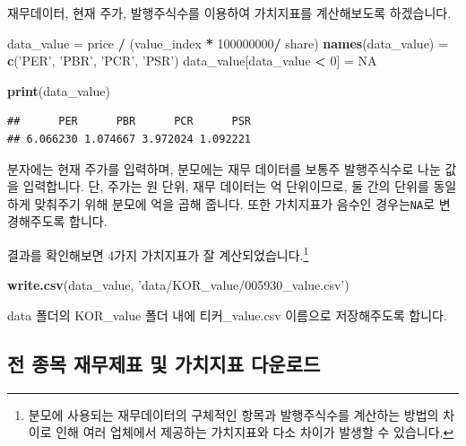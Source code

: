 \documentclass[]{book}
\newenvironment{Shaded}{\begin{snugshade}}{\end{snugshade}}
\newcommand{\DecValTok}[1]{\textcolor[rgb]{0.00,0.00,0.81}{#1}}
\newcommand{\KeywordTok}[1]{\textcolor[rgb]{0.13,0.29,0.53}{\textbf{#1}}}
\newcommand{\NormalTok}[1]{#1}
\newcommand{\OperatorTok}[1]{\textcolor[rgb]{0.81,0.36,0.00}{\textbf{#1}}}
\newcommand{\OtherTok}[1]{\textcolor[rgb]{0.56,0.35,0.01}{#1}}
\newcommand{\StringTok}[1]{\textcolor[rgb]{0.31,0.60,0.02}{#1}}
\let\rmarkdownfootnote\footnote%
\def\footnote{\protect\rmarkdownfootnote}
\begin{document}
재무데이터, 현재 주가, 발행주식수를 이용하여 가치지표를 계산해보도록 하겠습니다.

\begin{Shaded}
\begin{Highlighting}[]
\NormalTok{data_value =}\StringTok{ }\NormalTok{price }\OperatorTok{/}\StringTok{ }\NormalTok{(value_index }\OperatorTok{*}\StringTok{ }\DecValTok{100000000}\OperatorTok{/}\StringTok{ }\NormalTok{share)}
\KeywordTok{names}\NormalTok{(data_value) =}\StringTok{ }\KeywordTok{c}\NormalTok{(}\StringTok{'PER'}\NormalTok{, }\StringTok{'PBR'}\NormalTok{, }\StringTok{'PCR'}\NormalTok{, }\StringTok{'PSR'}\NormalTok{)}
\NormalTok{data_value[data_value }\OperatorTok{<}\StringTok{ }\DecValTok{0}\NormalTok{] =}\StringTok{ }\OtherTok{NA}

\KeywordTok{print}\NormalTok{(data_value)}
\end{Highlighting}
\end{Shaded}

\begin{verbatim}
##      PER      PBR      PCR      PSR 
## 6.066230 1.074667 3.972024 1.092221
\end{verbatim}

분자에는 현재 주가를 입력하며, 분모에는 재무 데이터를 보통주 발행주식수로 나눈 값을 입력합니다. 단, 주가는 원 단위, 재무 데이터는 억 단위이므로, 둘 간의 단위를 동일하게 맞춰주기 위해 분모에 억을 곱해 줍니다. 또한 가치지표가 음수인 경우는\texttt{NA}로 변경해주도록 합니다.

결과를 확인해보면 4가지 가치지표가 잘 계산되었습니다.\footnote{분모에 사용되는 재무데이터의 구체적인 항목과 발행주식수를 계산하는 방법의 차이로 인해 여러 업체에서 제공하는 가치지표와 다소 차이가 발생할 수 있습니다.}

\begin{Shaded}
\begin{Highlighting}[]
\KeywordTok{write.csv}\NormalTok{(data_value, }\StringTok{'data/KOR_value/005930_value.csv'}\NormalTok{)}
\end{Highlighting}
\end{Shaded}

data 폴더의 KOR\_value 폴더 내에 티커\_value.csv 이름으로 저장해주도록 합니다.

\hypertarget{section-29}{%
\subsection{전 종목 재무제표 및 가치지표 다운로드}\label{section-29}}
\end{document}
